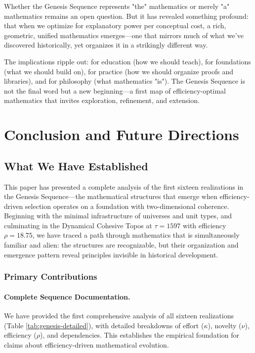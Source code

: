 \documentclass[11pt]{article}
\theoremstyle{definition}
\begin{document}
Whether the Genesis Sequence represents "the" mathematics or merely "a" mathematics remains an open question. But it has revealed something profound: that when we optimize for explanatory power per conceptual cost, a rich, geometric, unified mathematics emerges—one that mirrors much of what we've discovered historically, yet organizes it in a strikingly different way.

The implications ripple out: for education (how we should teach), for foundations (what we should build on), for practice (how we should organize proofs and libraries), and for philosophy (what mathematics "is"). The Genesis Sequence is not the final word but a new beginning—a first map of efficiency-optimal mathematics that invites exploration, refinement, and extension.


\section{Conclusion and Future Directions}
\label{sec:conclusion}

\subsection{What We Have Established}

This paper has presented a complete analysis of the first sixteen realizations in the Genesis Sequence—the mathematical structures that emerge when efficiency-driven selection operates on a foundation with two-dimensional coherence. Beginning with the minimal infrastructure of universes and unit types, and culminating in the Dynamical Cohesive Topos at $\tau=1597$ with efficiency $\rho=18.75$, we have traced a path through mathematics that is simultaneously familiar and alien: the structures are recognizable, but their organization and emergence pattern reveal principles invisible in historical development.

\subsubsection{Primary Contributions}

\paragraph{Complete Sequence Documentation.}
We have provided the first comprehensive analysis of all sixteen realizations (Table \ref{tab:genesis-detailed}), with detailed breakdowns of effort ($\kappa$), novelty ($\nu$), efficiency ($\rho$), and dependencies. This establishes the empirical foundation for claims about efficiency-driven mathematical evolution.
\end{document}
